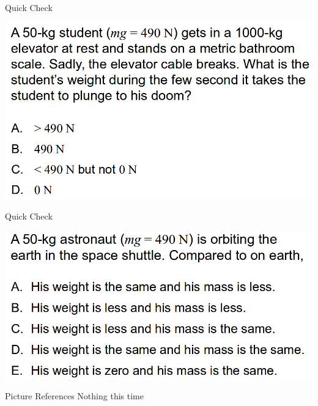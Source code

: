 \documentclass{beamer}
\newcommand{\red}[1]{{\color{red}{#1}}}
\newcommand{\checkL}[2]{\begin{textblock*}{1cm}(#1,#2){\Large \red{\Checkmark}}\end{textblock*}}
\begin{document}
\begin{frame}{Quick Check}
\begin{center}
   \includegraphics[width=\textwidth]{../figures/QC6_10.png}
\end{center}
\only<2>{\checkL{0.9cm}{7.2cm}}
\end{frame}

\begin{frame}{Quick Check}
\begin{center}
   \includegraphics[width=\textwidth]{../figures/QC6_11.png}
\end{center}
\only<2>{\checkL{0.9cm}{6.6cm}}
\end{frame}

\begin{frame}{Picture References}
\tiny
Nothing this time
\end{frame}
\end{document}
